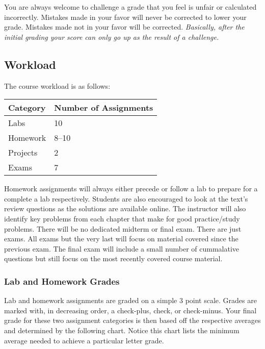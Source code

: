 \documentclass[nobib]{tufte-handout}
\begin{document}
You are always welcome to challenge a grade that you feel is unfair or calculated incorrectly.  Mistakes made in your favor will never be corrected to lower your grade.  Mistakes made not in your favor will be corrected.  \textit{Basically, after the initial grading your score can only go up as the result of a challenge.}

\subsection{Workload}

The course workload is as follows:
\begin{center}
  \begin{tabular}{ll}
    Category & Number of Assignments \\ \toprule
    Labs & 10 \\
    Homework & 8--10 \\
    Projects & 2 \\
    Exams & 7
  \end{tabular}
\end{center}

Homework assignments will always either precede or follow a lab to prepare for a complete a lab respectively. Students are also encouraged to look at the text's review questions as the solutions are available online.  The instructor will also identify key problems from each chapter that make for good practice/study problems. There will be no dedicated midterm or final exam. There are just exams.  All exams but the very last will focus on material covered since the previous exam. The final exam will include a small number of cummalative questions but still focus on the most recently covered course material.

\subsubsection{Lab and Homework Grades}

Lab and homework assignments are graded on a simple 3 point scale. Grades are marked with, in decreasing order, a check-plus, check, or check-minus. Your final grade for these two assignment categories is then based off the respective averages and determined by the following chart.  Notice this chart lists the minimum average needed to achieve a particular letter grade.
\end{document}
